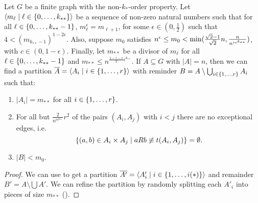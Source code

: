         \begin{lemma} \label{lem:existance_of_equitative_partition_with_bound_exceptional_pairs}
            Let $G$ be a finite graph with the non-$k_{*}$-order property.
            \sloppy Let $\left< m_\ell \mid \ell \in \{ 0, \dots, k_{**} \} \right>$ be a sequence of non-zero natural numbers such that
            for all $\ell \in \{ 0, \dots, k_{**}-1 \}$, $m_\ell^\epsilon = m_{\ell+1}$,
            for some $\epsilon \in (0, \frac{1}{2})$ such that $4 < (m_{k_{**}-1})^{1-2\epsilon}$.
            Also, suppose $m_0$ satisfies $n^\epsilon \leq m_0 < \min ( \frac{\sqrt{2}-1}{\sqrt{2}} n, \frac{n}{n^{c \epsilon^{k_{**}}}} )$,
            with $c \in (0, 1-\epsilon)$.
            Finally, let $m_{**}$ be a divisor of $m_\ell$ for all $\ell \in \{ 0, \dots, k_{**}-1 \}$ and
            $m_{**} \leq n^{\frac{1 - \epsilon - c}{3}\epsilon^{k_{**}}}$.
            If $A \subseteq G$ with $|A| = n$, then we can find a partition $\overline{A} = \left< A_i \mid i \in \{ 1, \dots, r \} \right>$
            with reminder $B = A \setminus \bigcup_{i \in \{ 1, \dots, r \}} A_i$ such that:
            \begin{enumerate}[label={\Roman*}., ref={\Roman*}, font=\rmfamily]
                \item \label{itm:existance_of_equitative_partition_with_bound_exceptional_pairs.1} $|A_i| = m_{**}$ for all $i \in \{ 1, \dots, r \}$.
                \item \label{itm:existance_of_equitative_partition_with_bound_exceptional_pairs.2} For all but $\frac{2}{n^{c\epsilon^{k_{**}}}}r^2$ of the pairs
                    $(A_i, A_j)$ with $i<j$ there are no exceptional edges, i.e.
                    \[
                        \{ (a,b) \in A_i \times A_j \mid a R b \not\equiv t(A_i, A_j) \} = \emptyset.
                    \]
                \item \label{itm:existance_of_equitative_partition_with_bound_exceptional_pairs.3} $|B| < m_0$.
            \end{enumerate}
            \begin{proof}
                We can use  to get a partition
                $\overline{A'} = \left< A'_i \mid i \in \{ 1, \dots, i(*) \} \right>$ and remainder $B' = A \setminus \bigcup A'$.
                We can refine the partition by randomly splitting each $A'_i$ into pieces of size $m_{**}$ ().

\end{proof}
\end{lemma}
